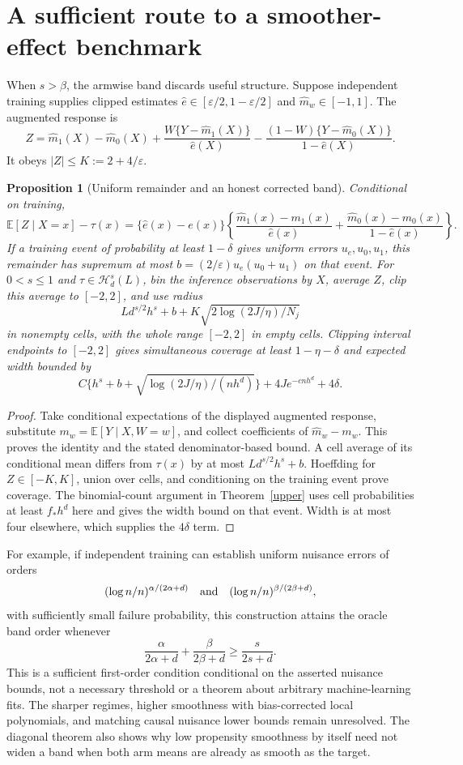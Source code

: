 \documentclass[11pt]{article}
\newtheorem{proposition}[theorem]{Proposition}
\theoremstyle{remark}
\newcommand{\E}{\mathbb E}
\begin{document}
\section{A sufficient route to a smoother-effect benchmark}
When $s>\beta$, the armwise band discards useful structure. Suppose independent training supplies clipped estimates
$\widehat e\in[\varepsilon/2,1-\varepsilon/2]$ and $\widehat m_w\in[-1,1]$. The augmented response is
\[
 Z=\widehat m_1(X)-\widehat m_0(X)
    +\frac{W\{Y-\widehat m_1(X)\}}{\widehat e(X)}
    -\frac{(1-W)\{Y-\widehat m_0(X)\}}{1-\widehat e(X)}.
\]
It obeys $|Z|\leq K:=2+4/\varepsilon$.

\begin{proposition}[Uniform remainder and an honest corrected band]\label{dr}
Conditional on training,
\[
 \E[Z\mid X=x]-\tau(x)
 =\{\widehat e(x)-e(x)\}
 \left\{\frac{\widehat m_1(x)-m_1(x)}{\widehat e(x)}
       +\frac{\widehat m_0(x)-m_0(x)}{1-\widehat e(x)}\right\}.
\]
If a training event of probability at least $1-\delta$ gives uniform errors $u_e,u_0,u_1$, this remainder has supremum at most
$b=(2/\varepsilon)u_e(u_0+u_1)$ on that event. For $0<s\leq1$ and $\tau\in\mathcal H_d^s(L)$, bin the inference observations by $X$, average $Z$, clip this average to $[-2,2]$, and use radius
\[
 Ld^{s/2}h^s+b+K\sqrt{2\log(2J/\eta)/N_j}
\]
in nonempty cells, with the whole range $[-2,2]$ in empty cells. Clipping interval endpoints to $[-2,2]$ gives simultaneous coverage at least $1-\eta-\delta$ and expected width bounded by
\[
 C\{h^s+b+\sqrt{\log(2J/\eta)/(nh^d)}\}
       +4J e^{-cnh^d}+4\delta.
\]
\end{proposition}
\begin{proof}
Take conditional expectations of the displayed augmented response, substitute $m_w=\E[Y\mid X,W=w]$, and collect coefficients of $\widehat m_w-m_w$. This proves the identity and the stated denominator-based bound. A cell average of its conditional mean differs from $\tau(x)$ by at most $Ld^{s/2}h^s+b$. Hoeffding for $Z\in[-K,K]$, union over cells, and conditioning on the training event prove coverage. The binomial-count argument in Theorem~\ref{upper} uses cell probabilities at least $f_*h^d$ here and gives the width bound on that event. Width is at most four elsewhere, which supplies the $4\delta$ term.
\end{proof}

For example, if independent training can establish uniform nuisance errors of orders
\[(\log n/n)^{\alpha/(2\alpha+d)}\quad\hbox{and}\quad
(\log n/n)^{\beta/(2\beta+d)},\]
with sufficiently small failure probability, this construction attains the oracle band order whenever
\[
 \frac{\alpha}{2\alpha+d}+\frac{\beta}{2\beta+d}
                         \geq\frac{s}{2s+d}.
\]
This is a sufficient first-order condition conditional on the asserted nuisance bounds, not a necessary threshold or a theorem about arbitrary machine-learning fits. The sharper regimes, higher smoothness with bias-corrected local polynomials, and matching causal nuisance lower bounds remain unresolved. The diagonal theorem also shows why low propensity smoothness by itself need not widen a band when both arm means are already as smooth as the target.
\end{document}
